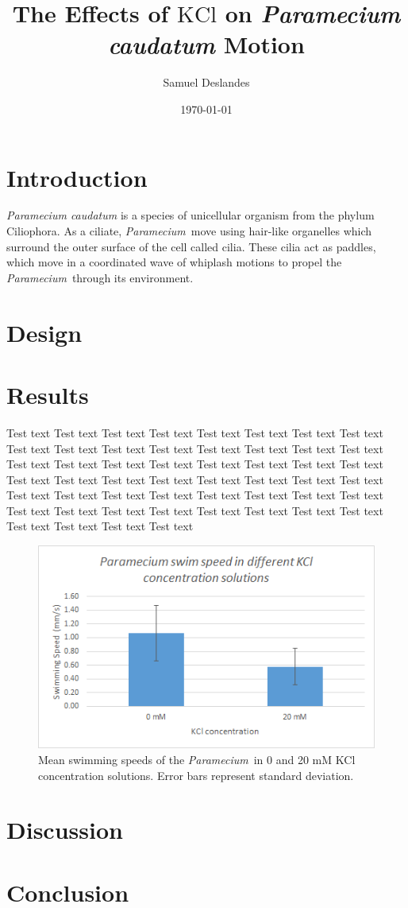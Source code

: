 \documentclass[12pt]{article}
\newcommand{\p}{\textit{Paramecium}}
\begin{document}
\title{The Effects of $\mathrm{KCl}$ on \textit{Paramecium caudatum} Motion}
\author{Samuel Deslandes}
\date{\today}
\maketitle

\section{Introduction}
	\textit{Paramecium caudatum} is a species of unicellular organism from the phylum Ciliophora. As a ciliate, \p\ move using hair-like organelles which surround the outer surface of the cell called cilia. These cilia act as paddles, which move in a coordinated wave of whiplash motions to propel the \p\ through its environment.     
\section{Design}

\section{Results}
	Test text Test text Test text Test text Test text Test text Test text Test text Test text Test text Test text Test text Test text Test text Test text Test text Test text Test text Test text Test text Test text Test text Test text Test text Test text Test text Test text Test text Test text Test text Test text Test text Test text Test text Test text Test text Test text Test text Test text Test text Test text Test text Test text Test text Test text Test text Test text Test text Test text Test text Test text Test text 
	
	\begin{figure}[h]
		\centering
		\includegraphics{chart1.png}
		\caption{Mean swimming speeds of the \p\ in 0 and 20 mM KCl concentration solutions. Error bars represent standard deviation.}
		\label{barGraph}
	\end{figure} 
	
\section{Discussion}

\section{Conclusion}
\end{document}
